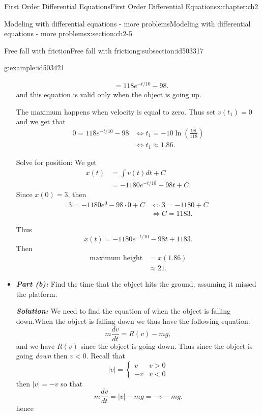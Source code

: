 \documentclass[oneside,10pt,]{book}
\newcommand{\alert}[1]{\textbf{\textit{#1}}}
\numberwithin{equation}{section}
\numberwithin{equation}{section}
\newcommand{\lt}{<}
\newcommand{\amp}{&}
\begin{document}
\begin{chapterptx}{First Order Differential Equations}{}{First Order Differential Equations}{}{}{x:chapter:ch2}
\begin{sectionptx}{Modeling with differential equations - more problems}{}{Modeling with differential equations - more problems}{}{}{x:section:ch2-5}
\begin{subsectionptx}{Free fall with friction}{}{Free fall with friction}{}{}{g:subsection:id503317}
\begin{example}{}{g:example:id503421}
\begin{itemize}[label=\textbullet]
\begin{align*}
\amp =118e^{-t/10}-98.
\end{align*}
and this equation is valid only when the object is going up.%
\par
The maximum happens when velocity is equal to zero. Thus set \(v(t_{1})=0\) and we get that%
\begin{align*}
0=118e^{-t/10}-98 \amp \iff t_{1}=-10\ln\left(\frac{98}{118}\right)\\
\amp \iff t_{1}\approx1.86.
\end{align*}
%
\par
Solve for position: We get%
\begin{align*}
x(t) \amp =\int v(t)dt+C\\
\amp =-1180e^{-t/10}-98t+C.
\end{align*}
Since \(x(0)=3\), then%
\begin{align*}
3=-1180e^{0}-98\cdot0+C \amp \iff3=-1180+C\\
\amp \iff C=1183.
\end{align*}
%
\par
Thus%
\begin{equation*}
x(t)=-1180e^{-t/10}-98t+1183.
\end{equation*}
Then%
\begin{align*}
\text{maximum height} \amp =x(1.86)\\
\amp \approx21.
\end{align*}
%
\item{}\alert{Part (b):} Find the time that the object hits the ground, assuming it missed the platform.%
\par
\alert{Solution:} We need to find the equation of when the object is falling down.When the object is falling down we thus have the following equation:%
\begin{equation*}
m\frac{dv}{dt}=R(v)-mg,
\end{equation*}
and we have \(R(v)\) since the object is going down. Thus since the object is going \emph{down} then \(v\lt0\). Recall that%
\begin{equation*}
\left|v\right|=\begin{cases}
v \amp v>0\\
-v \amp v\lt0
\end{cases}
\end{equation*}
then \(\left|v\right|=-v\) so that%
\begin{equation*}
m\frac{dv}{dt}=\left|v\right|-mg=-v-mg.
\end{equation*}
hence%
\begin{equation*}

\end{equation*}
\end{itemize}
\end{example}
\end{subsectionptx}
\end{sectionptx}
\end{chapterptx}
\end{document}
